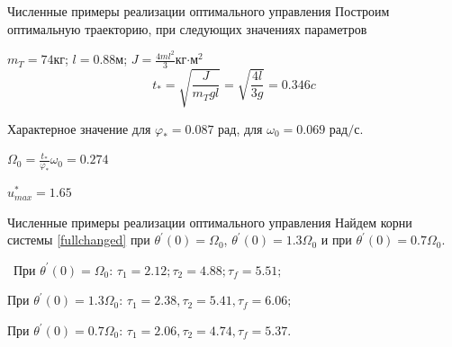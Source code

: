 \documentclass[10pt]{beamer}
\begin{document}
\begin{frame}{Численные примеры реализации оптимального управления}
	Построим оптимальную траекторию, при следующих значениях параметров

	$m_T=74$кг; $l=0.88$м; $J=\frac{4ml^2}{3}$кг$\cdot$м$^2$
	\[
		t_\ast=\sqrt{\frac{J}{m_Tgl}}=\sqrt{\frac{4l}{3g}}=0.346c
	\]



	Характерное значение для $\varphi_\ast=0.087 \text{ рад}$, для $\omega_0=0.069 \text{ рад/с}$.

	$\Omega_0=\frac{t_\ast}{\varphi_\ast}\omega_0=0.274$

	$u^*_{max}=1.65$

\end{frame}
\begin{frame}{Численные примеры реализации оптимального управления}
	Найдем корни системы \eqref{fullchanged} при $\theta^{'}(0)=\Omega_0$, $\theta^{'}(0)=1.3\Omega_0$ и при $\theta^{'}(0)=0.7\Omega_0$.

	\
	При $\theta^{'}(0)=\Omega_0$: $\tau_1=2.12;\tau_2=4.88;\tau_f=5.51;$

	При $\theta^{'}(0)=1.3\Omega_0$: $\tau_1=2.38,\tau_2=5.41,\tau_f=6.06;$

	При $\theta^{'}(0)=0.7\Omega_0$: $\tau_1=2.06,\tau_2=4.74,\tau_f=5.37.$

\end{frame}
\end{document}

